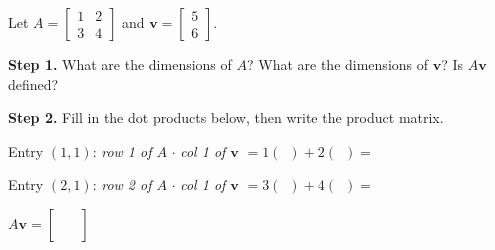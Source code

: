 \documentclass[10pt]{article}
\begin{document}
\namepartnerperiod

\vspace{0.12in}

\begin{tcolorbox}[colback=white, colframe=black!40,
    title=\textbf{Tier R --- Remediate: Matrix-Vector Product},
    fonttitle=\bfseries, arc=2mm, left=3mm, right=3mm, top=2mm, bottom=2mm]

Let $A = \begin{bmatrix}1 & 2 \\ 3 & 4\end{bmatrix}$ and $\mathbf{v} = \begin{bmatrix}5 \\ 6\end{bmatrix}$.

\medskip
\textbf{Step 1.} What are the dimensions of $A$? \underline{\hspace{2cm}}
What are the dimensions of $\mathbf{v}$? \underline{\hspace{2cm}}
Is $A\mathbf{v}$ defined? \underline{\hspace{2cm}}

\medskip
\textbf{Step 2.} Fill in the dot products below, then write the product matrix.

\medskip
Entry $(1,1)$: \textit{row 1 of $A$} $\cdot$ \textit{col 1 of $\mathbf{v}$}
$= 1(\phantom{0}) + 2(\phantom{0}) = $ \underline{\hspace{1.5cm}}

\medskip
Entry $(2,1)$: \textit{row 2 of $A$} $\cdot$ \textit{col 1 of $\mathbf{v}$}
$= 3(\phantom{0}) + 4(\phantom{0}) = $ \underline{\hspace{1.5cm}}

\medskip
$A\mathbf{v} = \begin{bmatrix}\phantom{00} \\ \phantom{00}\end{bmatrix}$

\end{tcolorbox}

\vspace{0.1in}
\end{document}

